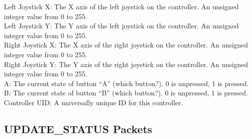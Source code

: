 \documentclass[11pt]{article}
\begin{document}
\newline
Left Joystick X: The X axis of the left joystick on the controller.  An unsigned integer value from 0 to 255.\\
Left Joystick Y: The Y axis of the left joystick on the controller.  An unsigned integer value from 0 to 255.\\
Right Joystick X: The X axis of the right joystick on the controller.  An unsigned integer value from 0 to 255.\\
Right Joystick Y: The Y axis of the right joystick on the controller.  An unsigned integer value from 0 to 255.\\
A: The current state of button “A” (which button?).  0 is unpressed, 1 is pressed.\\
B: The current state of button “B” (which button?).  0 is unpressed, 1 is pressed.\\
Controller UID: A universally unique ID for this controller.

\subsection {UPDATE\_STATUS Packets}
\end{document}

